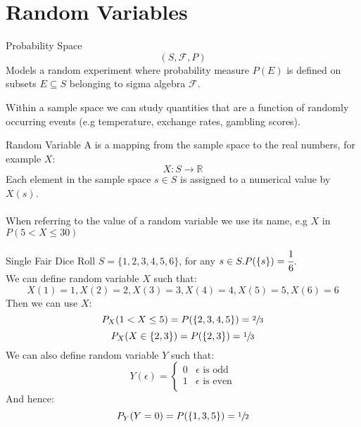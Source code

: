 \chapter{Random Variables}

\begin{definitionbox}{Probability Space}
    \[(S, \mathcal{F}, P )\]
    Models a random experiment where probability measure $P(E)$ is defined on subsets $E \subseteq S$ belonging to sigma algebra $\mathcal{F}$.
\end{definitionbox}

Within a sample space we can study quantities that are a function of randomly occurring events (e.g temperature, exchange rates, gambling scores).


\begin{definitionbox}{Random Variable}
	A  is a mapping from the sample space to the real numbers, for example  $X$:
	\[X: S \to \mathbb{R}\]
	Each element in the sample space $s \in S$ is assigned to a numerical value by $X(s)$.
	\\
	\\ When referring to the value of a random variable we use its name, e.g $X$ in $P(5 < X \leq 30)$
	\begin{itemize}
	\end{itemize}
\end{definitionbox}

\begin{examplebox}{Single Fair Dice Roll}
	$S = \{ 1,2,3,4,5,6 \}$, for any $s \in S. P( \{s \} ) = \cfrac{1}{6}$.
	\\ We can define random variable $X$ such that:
	\[X(1) = 1, X(2) = 2, X(3) = 3, X(4) = 4, X(5) = 5, X(6) = 6\]
	Then we can use $X$:
	\[P_X(1 < X \leq 5) = P(\{2,3,4,5\}) = \sfrac{2}{3}\]
	\[P_X(X \in \{2,3\}) = P(\{2,3\}) = \sfrac{1}{3}\]
	We can also define random variable $Y$ such that:
	\[Y(\epsilon) = \begin{cases}
			0 & \epsilon \text{ is odd}  \\
			1 & \epsilon \text{ is even} \\
		\end{cases}\]
	And hence:
	\[P_Y(Y = 0) = P(\{1,3,5\}) = \sfrac{1}{2}\]
\end{examplebox}

